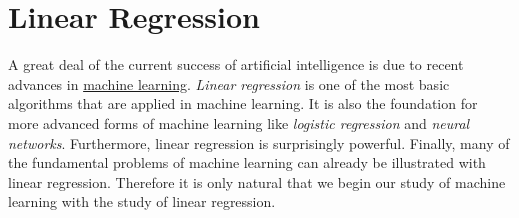 \chapter{Linear Regression}
A great deal of the current success of artificial intelligence is due to recent advances in
\href{https://en.wikipedia.org/wiki/Machine_learning}{machine learning}.  \emph{\color{blue}Linear regression}
is one of the most basic algorithms that are applied in machine learning.  It is also the foundation for more advanced
forms of machine learning like \emph{\color{blue}logistic regression} and \emph{\color{blue}neural networks}.
Furthermore, linear regression is surprisingly powerful.  Finally, many of the fundamental problems of machine
learning can already be illustrated with linear regression.  Therefore it is only natural that we begin our
study of machine learning with the study of linear regression.

